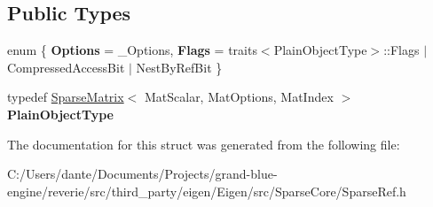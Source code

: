 \subsection*{Public Types}
\begin{DoxyCompactItemize}
\item 
\mbox{\label{struct_eigen_1_1internal_1_1traits_3_01_ref_3_01_sparse_matrix_3_01_mat_scalar_00_01_mat_optionsa860cad8c30d0eada972a685a49da86f_a10a2ef240ad28d1b062ef255d50f324c}} 
enum \{ {\bfseries Options} = \+\_\+\+Options, 
{\bfseries Flags} = traits$<$Plain\+Object\+Type$>$\+::Flags $\vert$ Compressed\+Access\+Bit $\vert$ Nest\+By\+Ref\+Bit
 \}
\item 
\mbox{\label{struct_eigen_1_1internal_1_1traits_3_01_ref_3_01_sparse_matrix_3_01_mat_scalar_00_01_mat_optionsa860cad8c30d0eada972a685a49da86f_a481a45a9d6b5a79e674f8c6f79edb3da}} 
typedef \mbox{\hyperlink{class_eigen_1_1_sparse_matrix}{Sparse\+Matrix}}$<$ Mat\+Scalar, Mat\+Options, Mat\+Index $>$ {\bfseries Plain\+Object\+Type}
\end{DoxyCompactItemize}


The documentation for this struct was generated from the following file\+:\begin{DoxyCompactItemize}
\item 
C\+:/\+Users/dante/\+Documents/\+Projects/grand-\/blue-\/engine/reverie/src/third\+\_\+party/eigen/\+Eigen/src/\+Sparse\+Core/Sparse\+Ref.\+h\end{DoxyCompactItemize}
